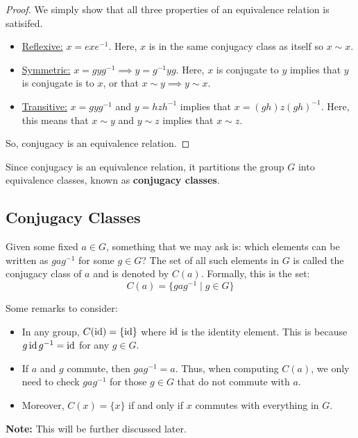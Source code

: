 \documentclass[letterpaper]{article}
\begin{document}
\begin{mdframed}
    \begin{proof}
        We simply show that all three properties of an equivalence relation is satisifed. 
        \begin{itemize}
            \item \underline{Reflexive:} $x = exe^{-1}$. Here, $x$ is in the same conjugacy class as itself so $x \sim x$. 
            \item \underline{Symmetric:} $x = gyg^{-1} \implies y = g^{-1}yg$. Here, $x$ is conjugate to $y$ implies that $y$ is conjugate is to $x$, or that $x \sim y \implies y \sim x$. 
            \item \underline{Transitive:} $x = gyg^{-1}$ and $y = hzh^{-1}$ implies that $x = (gh)z(gh)^{-1}$. Here, this means that $x \sim y$ and $y \sim z$ implies that $x \sim z$. 
        \end{itemize}
        So, conjugacy is an equivalence relation. 
    \end{proof}
\end{mdframed}
Since conjugacy is an equivalence relation, it partitions the group $G$ into equivalence classes, known as \textbf{conjugacy classes}. 

\subsection{Conjugacy Classes}
Given some fixed $a \in G$, something that we may ask is: which elements can be written as $gag^{-1}$ for some $g \in G$? The set of all such elements in $G$ is called the conjugacy class of $a$ and is denoted by $C(a)$. Formally, this is the set: 
\[C(a) = \{gag^{-1} \mid g \in G\}\]

Some remarks to consider:
\begin{itemize}
    \item In any group, $C(\operatorname{id}) = \{\operatorname{id}\}$ where $\operatorname{id}$ is the identity element. This is because $g \operatorname{id} g^{-1} = \operatorname{id}$ for any $g \in G$. 
    \item If $a$ and $g$ commute, then $gag^{-1} = a$. Thus, when computing $C(a)$, we only need to check $gag^{-1}$ for those $g \in G$ that do not commute with $a$.
    \item Moreover, $C(x) = \{x\}$ if and only if $x$ commutes with everything in $G$. 
\end{itemize}

\textbf{Note:} This will be further discussed later. 
\end{document}
